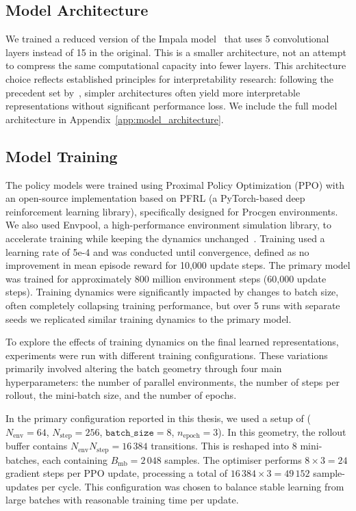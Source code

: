     \subsection{Model Architecture}
    \label{subsec:model_arch}
    We trained a reduced version of the Impala model~\citep{pmlr-v80-espeholt18a} that uses 5 convolutional layers instead of 15 in the original. This is a smaller architecture, not an attempt to compress the same computational capacity into fewer layers. This architecture choice reflects established principles for interpretability research: following the precedent set by~\citet{hilton_2020_understanding}, simpler architectures often yield more interpretable representations without significant performance loss. We include the full model architecture in Appendix~\ref{app:model_architecture}.

    \subsection{Model Training}
    \label{subsec:model_training}
    The policy models were trained using Proximal Policy Optimization (PPO) with an open-source implementation based on PFRL (a PyTorch-based deep reinforcement learning library), specifically designed for Procgen environments. We also used Envpool, a high-performance environment simulation library, to accelerate training while keeping the dynamics unchanged~\citep{weng2022envpool}. Training used a learning rate of 5e-4 and was conducted until convergence, defined as no improvement in mean episode reward for 10,000 update steps. The primary model was trained for approximately 800 million environment steps (60,000 update steps). Training dynamics were significantly impacted by changes to batch size, often completely collapsing training performance, but over 5 runs with separate seeds we replicated similar training dynamics to the primary model. 

    To explore the effects of training dynamics on the final learned representations, experiments were run with different training configurations. These variations primarily involved altering the batch geometry through four main hyperparameters: the number of parallel environments, the number of steps per rollout, the mini-batch size, and the number of epochs.


    In the primary configuration reported in this thesis, we used a setup of ($N_{\text{env}}=64$, $N_{\text{step}}=256$, $\texttt{batch\_size}=8$, $n_{\text{epoch}}=3$). In this geometry, the rollout buffer contains $N_{\text{env}}N_{\text{step}}=16\,384$ transitions. This is reshaped into $8$ mini-batches, each containing $B_{\text{mb}}=2\,048$ samples. The optimiser performs $8\times 3 = 24$ gradient steps per PPO update, processing a total of $16\,384\times 3 = 49\,152$ sample-updates per cycle. This configuration was chosen to balance stable learning from large batches with reasonable training time per update.

